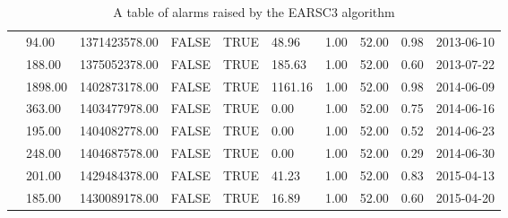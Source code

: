 \begin{table}[ht]
\begin{adjustwidth}{-2cm}{}
\begin{tabular}{llllllllll}
 & 94.00 & 1371423578.00 & FALSE & TRUE & 48.96 & 1.00 & 52.00 & 0.98 & 2013-06-10 \\ 
 & 188.00 & 1375052378.00 & FALSE & TRUE & 185.63 & 1.00 & 52.00 & 0.60 & 2013-07-22 \\ 
 & 1898.00 & 1402873178.00 & FALSE & TRUE & 1161.16 & 1.00 & 52.00 & 0.98 & 2014-06-09 \\ 
 & 363.00 & 1403477978.00 & FALSE & TRUE & 0.00 & 1.00 & 52.00 & 0.75 & 2014-06-16 \\ 
 & 195.00 & 1404082778.00 & FALSE & TRUE & 0.00 & 1.00 & 52.00 & 0.52 & 2014-06-23 \\ 
 & 248.00 & 1404687578.00 & FALSE & TRUE & 0.00 & 1.00 & 52.00 & 0.29 & 2014-06-30 \\ 
 & 201.00 & 1429484378.00 & FALSE & TRUE & 41.23 & 1.00 & 52.00 & 0.83 & 2015-04-13 \\ 
 & 185.00 & 1430089178.00 & FALSE & TRUE & 16.89 & 1.00 & 52.00 & 0.60 & 2015-04-20 \\ 
   \hline
\end{tabular}
\caption{A table of alarms raised by the EARSC3 algorithm}
\end{adjustwidth}
\label{tab:tseriesEARSC3RADtable}
\end{table}


